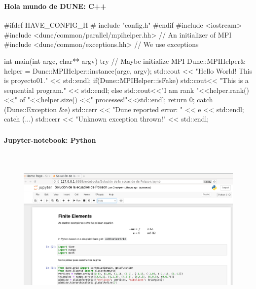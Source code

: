 \begin{frame}[fragile]
	\frametitle{\secname}
	\framesubtitle{Hola mundo de DUNE: C++}
\small{
\begin{python}
	#ifdef HAVE_CONFIG_H # include "config.h"
	#endif 	#include <iostream>
	#include <dune/common/parallel/mpihelper.hh> // An initializer of MPI
	#include <dune/common/exceptions.hh> // We use exceptions
	
	int main(int argc, char** argv)
	{
	  try{
		// Maybe initialize MPI
		Dune::MPIHelper& helper = Dune::MPIHelper::instance(argc, argv);
		std::cout << "Hello World! This is proyecto01." << std::endl;
		if(Dune::MPIHelper::isFake)
		  std::cout<< "This is a sequential program." << std::endl;
		else
		  std::cout<<"I am rank "<<helper.rank()<<" of "<<helper.size()
			<<" processes!"<<std::endl;
		return 0;
	  }
	  catch (Dune::Exception &e){
		std::cerr << "Dune reported error: " << e << std::endl;
	  }
	  catch (...){
		std::cerr << "Unknown exception thrown!" << std::endl;
	  }
	}
\end{python}
}
\end{frame}
\begin{frame}
	\frametitle{\secname}
	\framesubtitle{Jupyter-notebook: Python}
	\begin{figure}[ht!]
		\centering
		\includegraphics[height=8cm, width=12cm]{jupyter01}
	\end{figure}
\end{frame}
